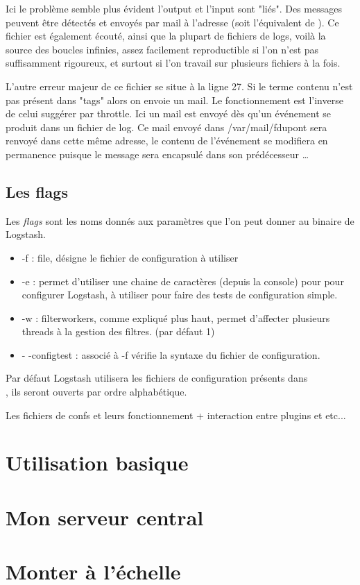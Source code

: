 Ici le problème semble plus évident l'output et l'input sont "liés". Des messages
peuvent être détectés et envoyés par mail à l'adresse  (soit
l'équivalent de ). Ce fichier est également écouté, ainsi que la 
plupart de fichiers de logs, voilà la source des boucles infinies, assez facilement
reproductible si l'on n'est pas suffisamment rigoureux, et surtout si l'on travail 
sur plusieurs fichiers à la fois.

L'autre erreur majeur de ce fichier se situe à la ligne 27. Si le terme contenu 
n'est pas présent dans "tags" alors on envoie un mail. Le fonctionnement est l'inverse 
de celui suggérer par throttle. Ici un mail est envoyé dès qu'un événement se produit
dans un fichier de log. Ce mail envoyé dans /var/mail/fdupont sera renvoyé dans cette
même adresse, le contenu de l'événement se modifiera en permanence puisque le message
sera encapsulé dans son prédécesseur \ldots


\subsection{Les flags}
Les \emph{flags} sont les noms donnés aux paramètres que l'on peut donner au binaire
de Logstash.

\begin{itemize}
    \item -f : file, désigne le fichier de configuration à utiliser
    \item -e : permet d'utiliser une chaine de caractères (depuis la console) pour
    pour configurer Logstash, à utiliser pour faire des tests de configuration simple.
    \item -w : filterworkers, comme expliqué plus haut, permet d'affecter plusieurs
    threads à la gestion des filtres. (par défaut 1)
    \item - -configtest : associé à -f  vérifie la syntaxe 
    du fichier de configuration.
\end{itemize}

Par défaut Logstash utilisera les fichiers de configuration présents dans \\ , ils seront ouverts par ordre alphabétique.




Les fichiers de confs et leurs fonctionnement + interaction entre plugins et etc...

\section{Utilisation basique}

\section{Mon serveur central}



\section{Monter à l'échelle}




